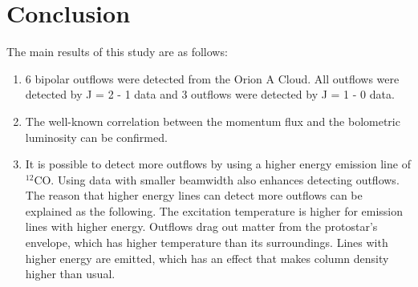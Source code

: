 \newpage

\section{Conclusion}
The main results of this study are as follows:
\begin{enumerate}
	\item 6 bipolar outflows were detected from the Orion A Cloud. All outflows were detected by J = 2 - 1 data and 3 outflows were detected by J = 1 - 0 data.
	\item The well-known correlation between the momentum flux and the bolometric luminosity can be confirmed.
	\item It is possible to detect more outflows by using a higher energy emission line of $^{12}$CO. Using data with smaller beamwidth also enhances detecting outflows. The reason that higher energy lines can detect more outflows can be explained as the following. The excitation temperature is higher for emission lines with higher energy. Outflows drag out matter from the protostar's envelope, which has higher temperature than its surroundings. Lines with higher energy are emitted, which has an effect that makes column density higher than usual.	
\end{enumerate}